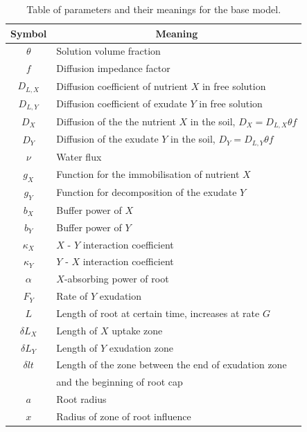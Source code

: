 \documentclass[11pt]{article}
\numberwithin{equation}{section}
\begin{document}
\begin{table}[!htb]
\begin{center}
\fontsize{9.5}{7}\selectfont
\setlength{\tabcolsep}{5.pt}
\def\arraystretch{1.5}
\begin{tabular}{cl}
\toprule
    \bf Symbol & \multicolumn{1}{c}{\bf Meaning}
    \\ \midrule
    $\theta$ & Solution volume fraction \\
    $f$ & Diffusion impedance factor \\
    $D_{L,X}$ & Diffusion coefficient of nutrient $X$  in free solution \\
    $D_{L,Y}$ & Diffusion coefficient of exudate $Y$  in free solution \\
    $D_X$ & Diffusion of the the nutrient $X$ in the soil, $D_X = D_{L,X} \theta f$  \\  
	$D_{Y}$ &  Diffusion of the exudate $Y$ in the soil, $D_{Y} = D_{L,Y} \theta f$  \\ 
	$\nu$ & Water flux\\
	$g_X$ & Function for the immobilisation of nutrient $X$ \\
	$g_{Y}$ & Function for decomposition of the exudate $Y$ \\
	$b_X$ & Buffer power of $X$ \\
	$b_{Y}$ & Buffer power of $Y$ \\
	$\kappa_{X}$ & $X$ - $Y$ interaction coefficient \\
	$\kappa_{Y}$ & $Y$ - $X$ interaction coefficient\\
	$\alpha $ & $X$-absorbing power of root \\
	$F_{Y} $ & Rate of $Y$ exudation  \\
	$L$ & Length of root at certain time, increases at rate $G$ \\
	$\delta L_{X}$ & Length of $X$ uptake zone \\
	$\delta L_{Y}$ & Length of $Y$ exudation zone  \\	
	$\delta lt$ & Length of the zone between the end of exudation zone\\& and the beginning of root cap \\
	$a$ & Root radius \\
	$x$ & Radius of zone of root influence \\
\bottomrule
\end{tabular}
\caption{Table of parameters and their meanings for the base model.
\label{t:First-model-params}}
\end{center}
\end{table}
\end{document}
